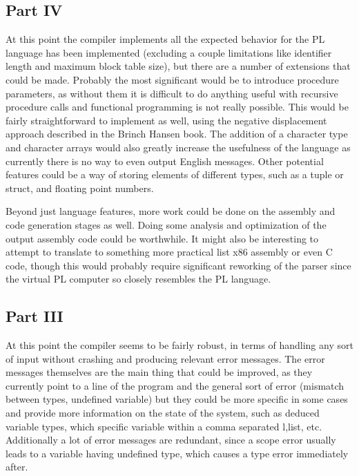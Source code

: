 \documentclass{article}
\begin{document}
        \subsection{Part IV}

        At this point the compiler implements all the expected behavior for the PL language has been implemented (excluding a couple limitations like identifier length and maximum block table size), but there are a number of extensions that could be made. Probably the most significant would be to introduce procedure parameters, as without them it is difficult to do anything useful with recursive procedure calls and functional programming is not really possible. This would be fairly straightforward to implement as well, using the negative displacement approach described in the Brinch Hansen book. The addition of a character type and character arrays would also greatly increase the usefulness of the language as currently there is no way to even output English messages. Other potential features could be a way of storing elements of different types, such as a tuple or struct, and floating point numbers. 

        Beyond just language features, more work could be done on the assembly and code generation stages as well. Doing some analysis and optimization of the output assembly code could be worthwhile. It might also be interesting to attempt to translate to something more practical list x86 assembly or even C code, though this would probably require significant reworking of the parser since the virtual PL computer so closely resembles the PL language.

        \subsection{Part III}

        At this point the compiler seems to be fairly robust, in terms of handling any sort of input without crashing and producing relevant error messages. The error messages themselves are the main thing that could be improved, as they currently point to a line of the program and the general sort of error (mismatch between types, undefined variable) but they could be more specific in some cases and provide more information on the state of the system, such as deduced variable types, which specific variable within a comma separated l,list, etc. Additionally a lot of error messages are redundant, since a scope error usually leads to a variable having undefined type, which causes a type error immediately after. 
\end{document}

